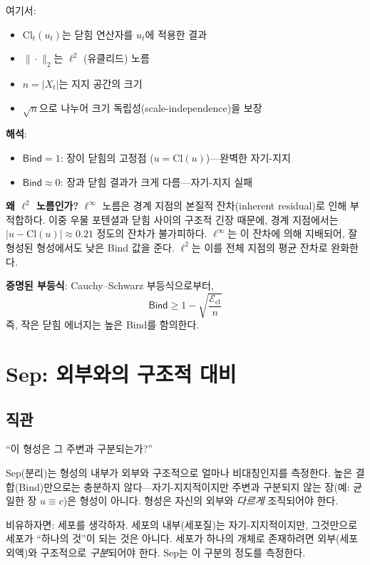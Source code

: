 여기서:
\begin{itemize}
    \item $\mathrm{Cl}_t(u_t)$는 닫힘 연산자를 $u_t$에 적용한 결과
    \item $\|\cdot\|_2$는 $\ell^2$ (유클리드) 노름
    \item $n = |X_t|$는 지지 공간의 크기
    \item $\sqrt{n}$으로 나누어 크기 독립성(scale-independence)을 보장
\end{itemize}

\textbf{해석}:
\begin{itemize}
    \item $\mathsf{Bind} = 1$: 장이 닫힘의 고정점 ($u = \mathrm{Cl}(u)$)---완벽한 자기-지지
    \item $\mathsf{Bind} \approx 0$: 장과 닫힘 결과가 크게 다름---자기-지지 실패
\end{itemize}

\textbf{왜 $\ell^2$ 노름인가?} $\ell^\infty$ 노름은 경계 지점의 본질적 잔차(inherent residual)로 인해 부적합하다. 이중 우물 포텐셜과 닫힘 사이의 구조적 긴장 때문에, 경계 지점에서는 $|u - \mathrm{Cl}(u)| \approx 0.21$ 정도의 잔차가 불가피하다. $\ell^\infty$는 이 잔차에 의해 지배되어, 잘 형성된 형성에서도 낮은 Bind 값을 준다. $\ell^2$는 이를 전체 지점의 평균 잔차로 완화한다.

\textbf{증명된 부등식}: Cauchy--Schwarz 부등식으로부터,
\begin{equation}
    \mathsf{Bind} \geq 1 - \sqrt{\frac{\mathcal{E}_{\mathrm{cl}}}{n}}
    \label{eq:bind-energy-bound}
\end{equation}
즉, 작은 닫힘 에너지는 높은 Bind를 함의한다.


\section{Sep: 외부와의 구조적 대비}
\label{sec:sep}

\subsection{직관}

``이 형성은 그 주변과 구분되는가?''

Sep(분리)는 형성의 내부가 외부와 구조적으로 얼마나 비대칭인지를 측정한다. 높은 결합(Bind)만으로는 충분하지 않다---자기-지지적이지만 주변과 구분되지 않는 장(예: 균일한 장 $u \equiv c$)은 형성이 아니다. 형성은 자신의 외부와 \emph{다르게} 조직되어야 한다.

비유하자면: 세포를 생각하자. 세포의 내부(세포질)는 자기-지지적이지만, 그것만으로 세포가 ``하나의 것''이 되는 것은 아니다. 세포가 하나의 개체로 존재하려면 외부(세포외액)와 구조적으로 \emph{구분}되어야 한다. Sep는 이 구분의 정도를 측정한다.


